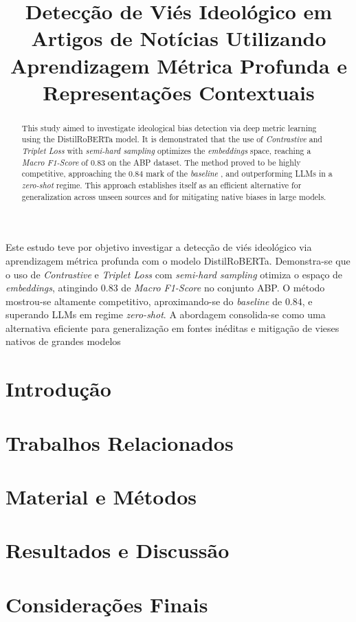 \documentclass[12pt]{article}
\title{Detecção de Viés Ideológico em Artigos de Notícias Utilizando Aprendizagem Métrica Profunda e Representações Contextuais}
\begin{document}
 

\maketitle

\begin{abstract}
  This study aimed to investigate ideological bias detection via deep metric learning using the DistilRoBERTa model. It is demonstrated that the use of \textit{Contrastive} and \textit{Triplet Loss} 
  with \textit{semi-hard sampling} optimizes the \textit{embeddings} space, reaching a \textit{Macro F1-Score} of $0.83$ on the ABP dataset. The method proved to be highly competitive, approaching 
  the $0.84$ mark of the \textit{baseline} \cite{volf2025political}, and outperforming LLMs in a \textit{zero-shot} regime. This approach establishes itself as an efficient alternative for 
  generalization across unseen sources and for mitigating native biases in large models.
\end{abstract}
     
\begin{resumo} 
  Este estudo teve por objetivo investigar a detecção de viés ideológico via aprendizagem métrica profunda com o modelo DistilRoBERTa. Demonstra-se que o uso de 
  \textit{Contrastive} e \textit{Triplet Loss} com \textit{semi-hard sampling} otimiza o espaço de \textit{embeddings}, atingindo $0.83$ de \textit{Macro F1-Score} no conjunto ABP. 
  O método mostrou-se altamente competitivo, aproximando-se do \textit{baseline} \cite{volf2025political} de $0.84$, e superando LLMs em regime \textit{zero-shot}. 
  A abordagem consolida-se como uma alternativa eficiente para generalização em fontes inéditas e mitigação de vieses nativos de grandes modelos
\end{resumo}


\section{Introdução}\label{sec:intro}


\section{Trabalhos Relacionados}\label{sec:trabalhos}


\section{Material e Métodos}\label{sec:material}


\section{Resultados e Discussão}\label{sec:resultados}


\section{Considerações Finais}




\end{document}
